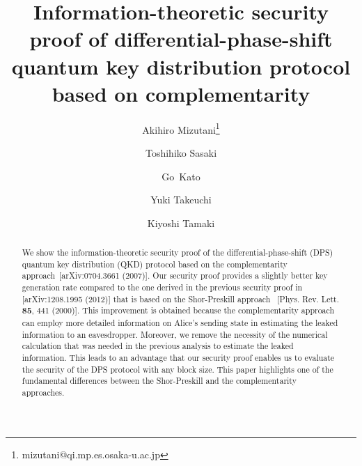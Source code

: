 \documentclass[prl,twocolumn,superscriptaddress,nofootinbib]{revtex4}
\begin{document}
\title{
  Information-theoretic security proof of differential-phase-shift quantum key distribution protocol based on complementarity
}
\author{Akihiro Mizutani\footnote{mizutani@qi.mp.es.osaka-u.ac.jp}}
\author{Toshihiko Sasaki}
\author{Go~Kato}
\author{Yuki Takeuchi}
\author{Kiyoshi Tamaki}
\begin{abstract}
  We show the information-theoretic security proof of the differential-phase-shift (DPS) quantum key distribution (QKD) protocol
  based on the complementarity approach~[arXiv:0704.3661 (2007)].
  Our security proof provides a slightly better key generation rate compared to the one derived in the previous
  security proof in [arXiv:1208.1995 (2012)] that is based on the Shor-Preskill approach~
  [Phys. Rev. Lett. {\bf 85}, 441 (2000)]. 
  This improvement is obtained because the complementarity approach can employ
  more detailed information on Alice's sending state in estimating the leaked information to an eavesdropper.
  Moreover, we remove the necessity of the numerical calculation that was needed in the previous analysis
  to estimate the leaked information. This leads to an advantage that our security proof enables 
  us to evaluate the security of the DPS protocol with any block size. 
  This paper highlights one of the fundamental differences between the Shor-Preskill and the complementarity approaches.
\end{abstract}
\maketitle
\end{document}
